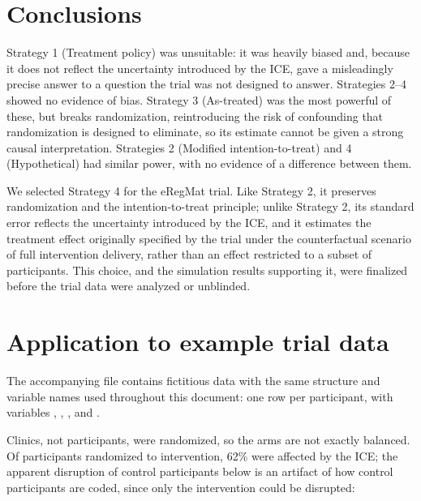 \section{Conclusions}\label{sec:conclusions}

Strategy 1 (Treatment policy) was unsuitable: it was heavily biased and,
because it does not reflect the uncertainty introduced by the ICE, gave a
misleadingly precise answer to a question the trial was not designed to
answer. Strategies 2--4 showed no evidence of bias. Strategy 3
(As-treated) was the most powerful of these, but breaks randomization,
reintroducing the risk of confounding that randomization is designed to
eliminate, so its estimate cannot be given a strong causal interpretation.
Strategies 2 (Modified intention-to-treat) and 4 (Hypothetical) had
similar power, with no evidence of a difference between them.

We selected Strategy 4 for the eRegMat trial. Like Strategy 2, it
preserves randomization and the intention-to-treat principle; unlike
Strategy 2, its standard error reflects the uncertainty introduced by the
ICE, and it estimates the treatment effect originally specified by the
trial under the counterfactual scenario of full intervention delivery,
rather than an effect restricted to a subset of participants. This
choice, and the simulation results supporting it, were finalized before
the trial data were analyzed or unblinded.


\section{Application to example trial data}\label{sec:application}

The accompanying file  contains fictitious data with
the same structure and variable names used throughout this document: one
row per participant, with variables , ,
, and .

\begin{minipage}{\linewidth}
\begin{stlog}
\nullskip
\end{stlog}
\end{minipage}

Clinics, not participants, were randomized, so the arms are not exactly
balanced. Of participants randomized to intervention, 62\% were affected
by the ICE; the apparent disruption of control participants below is an
artifact of how control participants are coded, since only the
intervention could be disrupted:

